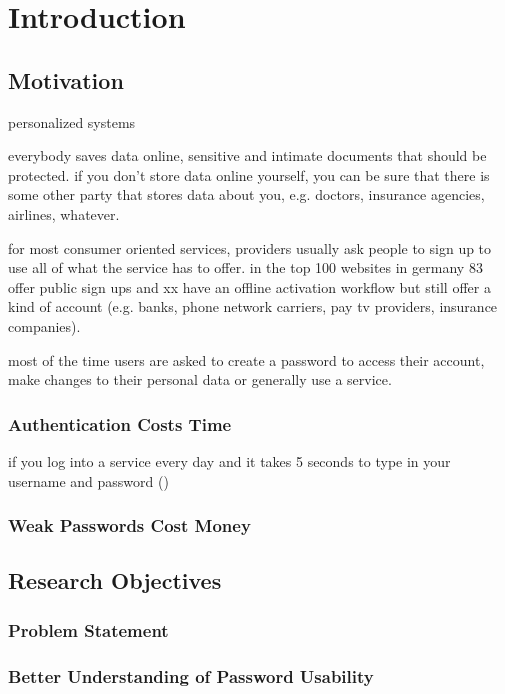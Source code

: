 
\chapter[Introduction]{Introduction}\label{chap:intro}


\section{Motivation}
personalized systems


everybody saves data online, sensitive and intimate documents that should be protected.
if you don't store data online yourself, you can be sure that there is some other party
that stores data about you, e.g. doctors, insurance agencies, airlines, whatever. 

for most consumer oriented services, providers usually ask people to sign up to use
all of what the service has to offer. in the top 100 websites in germany 83 offer public sign ups and xx have an offline activation workflow but still offer a kind of account (e.g. banks, phone network carriers, pay tv providers, insurance companies). 

most of the time users are asked to create a password to access their account, make changes to their personal data or generally use a service. 




\subsection{Authentication Costs Time}
if you log into a service every day and it takes 5 seconds to type in your username and password ()


\subsection{Weak Passwords Cost Money}

\section{Research Objectives}
\subsection{Problem Statement}
\subsection{Better Understanding of Password Usability}
